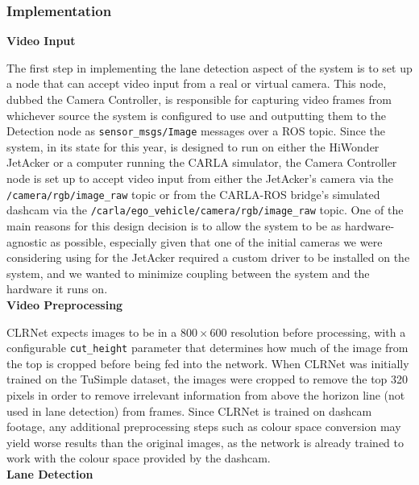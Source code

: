 \documentclass[titlepage, draft]{article}
\begin{document}
{\subsubsection{Implementation}
\textbf{Video Input}

The first step in implementing the lane detection aspect of the system is to set up a node that can accept video input
from a real or virtual camera.
This node, dubbed the Camera Controller, is responsible for capturing video frames from whichever source the system is
configured to use and outputting them to the Detection node as \texttt{sensor\_msgs/Image} messages over a ROS topic.
Since the system, in its state for this year, is designed to run on either the HiWonder JetAcker or a computer running
the CARLA simulator, the Camera Controller node is set up to accept video input from either the JetAcker's camera
via the \texttt{/camera/rgb/image\_raw} topic or from the CARLA-ROS bridge's simulated dashcam via the
\texttt{/carla/ego\_vehicle/camera/rgb/image\_raw} topic.
One of the main reasons for this design decision is to allow the system to be as hardware-agnostic as possible,
especially given that one of the initial cameras we were considering using for the JetAcker required a custom driver
to be installed on the system, and we wanted to minimize coupling between the system and the hardware it runs on.
\\

\textbf{Video Preprocessing}

CLRNet expects images to be in a $800 \times 600$ resolution before processing, with a configurable \texttt{cut\_height}
parameter that determines how much of the image from the top is cropped before being fed into the network.
When CLRNet was initially trained on the TuSimple dataset, the images were cropped to remove the top 320 pixels in order
to remove irrelevant information from above the horizon line (not used in lane detection) from frames.
Since CLRNet is trained on dashcam footage, any additional preprocessing steps such as colour space conversion
may yield worse results than the original images, as the network is already trained to work with the colour space
provided by the dashcam.
\\

\textbf{Lane Detection}

}
\end{document}
